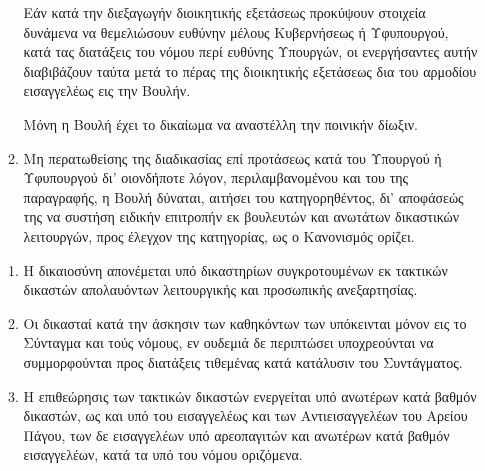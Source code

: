 \documentclass[twoside, a4paper, 10pt]{article}
\begin{document}
\begin{multicols}{2}
\begin{enumerate}
\begin{BigQuote}
\begin{enumerate}
	Εάν κατά την διεξαγωγήν διοικητικής εξετάσεως προκύψουν στοιχεία δυνάμενα να θεμελιώσουν ευθύνην μέλους Κυβερνήσεως ή Υφυπουργού, κατά τας διατάξεις του νόμου περί ευθύνης Υπουργών, οι ενεργήσαντες αυτήν διαβιβάζουν ταύτα μετά το πέρας της διοικητικής εξετάσεως δια του αρμοδίου εισαγγελέως εις την Βουλήν.

	Μόνη η Βουλή έχει το δικαίωμα να αναστέλλη την ποινικήν δίωξιν.
  \item[3.] Μη περατωθείσης της διαδικασίας επί προτάσεως κατά του Υπουργού ή Υφυπουργού δι' οιονδήποτε λόγον, περιλαμβανομένου και του της παραγραφής, η Βουλή δύναται, αιτήσει του κατηγορηθέντος, δι' αποφάσεώς της να συστήση ειδικήν επιτροπήν εκ βουλευτών και ανωτάτων δικαστικών λειτουργών, προς έλεγχον της κατηγορίας, ως ο Κανονισμός ορίζει.
\end{enumerate}

\begin{enumerate}
  \item[1.] Η δικαιοσύνη απονέμεται υπό δικαστηρίων συγκροτουμένων εκ τακτικών δικαστών απολαυόντων λειτουργικής και προσωπικής ανεξαρτησίας.
  \item[2.] Οι δικασταί κατά την άσκησιν των καθηκόντων των υπόκεινται μόνον εις το Σύνταγμα και τούς νόμους, εν ουδεμιά δε περιπτώσει υποχρεούνται να συμμορφούνται προς διατάξεις τιθεμένας κατά κατάλυσιν του Συντάγματος.
  \item[3.] Η επιθεώρησις των τακτικών δικαστών ενεργείται υπό ανωτέρων κατά βαθμόν δικαστών, ως και υπό του εισαγγελέως και των Αντιεισαγγελέων του Αρείου Πάγου, των δε εισαγγελέων υπό αρεοπαγιτών και ανωτέρων κατά βαθμόν εισαγγελέων, κατά τα υπό του νόμου οριζόμενα.
\end{enumerate}


\end{BigQuote}
\end{enumerate}
\end{multicols}
\end{document}
